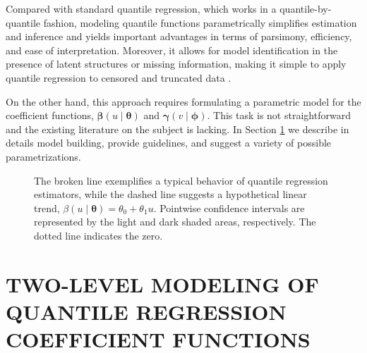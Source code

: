 \documentclass[12pt]{article}
\def\thetavec{\bm{\theta}}
\def\phivec{\bm{\phi}}
\def\betavec{\bm{\beta}}
\def\gammavec{\bm{\gamma}}
\begin{document}
Compared with standard quantile regression, which works in a quantile-by-quantile fashion,
modeling quantile functions parametrically simplifies estimation and inference and yields important 
advantages in terms of parsimony, efficiency, and ease of interpretation. Moreover,
it allows for model identification in the presence of latent structures or missing information,
making it simple to apply quantile regression to censored and truncated data \citep{ctiqr}.


On the other hand, this approach requires formulating a parametric model for the coefficient functions,
$\betavec(u\mid\thetavec)$ and $\gammavec(v\mid\phivec)$. This task is not straightforward and
the existing literature on the subject is lacking. In Section \ref{sec:model} we describe in details
model building, provide guidelines, and suggest a variety of possible parametrizations.

\begin{figure}[h]
    \centering    
	\caption{\label{fig1}
	The broken line exemplifies a typical behavior of quantile regression estimators,
	while the dashed line suggests a hypothetical linear trend, $\beta(u \mid \thetavec) = \theta_0 + \theta_1 u$.
	Pointwise confidence intervals are represented by the light and dark shaded areas, respectively. 
	The dotted line indicates the zero.}
\end{figure}




\section{TWO-LEVEL MODELING OF QUANTILE REGRESSION COEFFICIENT FUNCTIONS}\label{sec:model}
\end{document}
